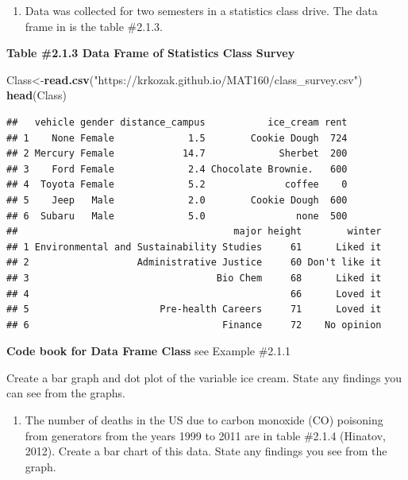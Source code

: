 \documentclass[]{book}
\newenvironment{Shaded}{\begin{snugshade}}{\end{snugshade}}
\newcommand{\KeywordTok}[1]{\textcolor[rgb]{0.13,0.29,0.53}{\textbf{#1}}}
\newcommand{\NormalTok}[1]{#1}
\newcommand{\StringTok}[1]{\textcolor[rgb]{0.31,0.60,0.02}{#1}}
\providecommand{\tightlist}{%
  \setlength{\itemsep}{0pt}\setlength{\parskip}{0pt}}
\begin{document}
\begin{enumerate}
\def\labelenumi{\arabic{enumi}.}
\setcounter{enumi}{1}
\tightlist
\item
  Data was collected for two semesters in a statistics class drive. The data frame in is the table \#2.1.3.
\end{enumerate}

\textbf{Table \#2.1.3 Data Frame of Statistics Class Survey}

\begin{Shaded}
\begin{Highlighting}[]
\NormalTok{Class<-}\KeywordTok{read.csv}\NormalTok{(}\StringTok{"https://krkozak.github.io/MAT160/class_survey.csv"}\NormalTok{)}
\KeywordTok{head}\NormalTok{(Class)}
\end{Highlighting}
\end{Shaded}

\begin{verbatim}
##   vehicle gender distance_campus           ice_cream rent
## 1    None Female             1.5        Cookie Dough  724
## 2 Mercury Female            14.7             Sherbet  200
## 3    Ford Female             2.4 Chocolate Brownie.   600
## 4  Toyota Female             5.2              coffee    0
## 5    Jeep   Male             2.0        Cookie Dough  600
## 6  Subaru   Male             5.0                none  500
##                                      major height        winter
## 1 Environmental and Sustainability Studies     61      Liked it
## 2                   Administrative Justice     60 Don't like it
## 3                                 Bio Chem     68      Liked it
## 4                                              66      Loved it
## 5                       Pre-health Careers     71      Loved it
## 6                                  Finance     72    No opinion
\end{verbatim}

\textbf{Code book for Data Frame Class} see Example \#2.1.1

Create a bar graph and dot plot of the variable ice cream. State any findings you can see from the graphs.

\begin{enumerate}
\def\labelenumi{\arabic{enumi}.}
\setcounter{enumi}{2}
\tightlist
\item
  The number of deaths in the US due to carbon monoxide (CO) poisoning from generators from the years 1999 to 2011 are in table \#2.1.4 (Hinatov, 2012). Create a bar chart of this data. State any findings you see from the graph.
\end{enumerate}
\end{document}
